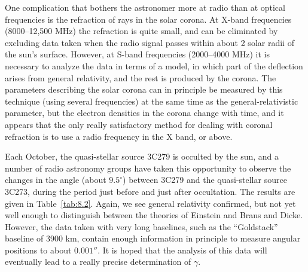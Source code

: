 One complication that bothers the astronomer more at radio than at optical
frequencies is the refraction of rays in the solar corona. At X-band
frequencies (8000--12,500 MHz) the refraction is quite small, and can be
eliminated by excluding data taken when the radio signal passes within
about 2 solar radii of the sun's surface. However, at S-band frequencies
(2000--4000 MHz) it is necessary to analyze the data in terms of a model,
in which part of the deflection arises from general relativity, and the rest
is produced by the corona. The parameters describing the solar corona can
in principle be measured by this technique (using several frequencies) at
the same time as the general-relativistic parameter, but the electron
densities in the corona change with time, and it appears that the only
really satisfactory method for dealing with coronal refraction is to use a
radio frequency in the X band, or above.

Each October, the quasi-stellar source 3C279 is occulted by the sun, and a
number of radio astronomy groups have taken this opportunity to observe the
changes in the angle (about \(9.5^\circ\)) between 3C279 and the
quasi-stellar source 3C273, during the period just before and just after
occultation. The results are given in Table~\ref{tab:8.2}. Again, we see
general relativity confirmed, but not yet well enough to distinguish
between the theories of Einstein and Brans and Dicke. However, the data
taken with very long baselines, such as the ``Goldstack'' baseline of
3900 km, contain enough information in principle to measure angular
positions to about \(0.001''\). It is hoped that the analysis of this data
will eventually lead to a really precise determination of \(\gamma\).

